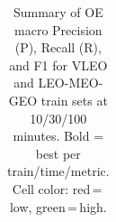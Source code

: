 \begin{table}[t]
{\begin{tabular}{l ccc ccc ccc ccc ccc ccc}
\bottomrule
\end{tabular}%
}
\caption{Summary of OE macro Precision (P), Recall (R), and F1 for VLEO and LEO-MEO-GEO train sets at 10/30/100 minutes. Bold = best per train/time/metric. Cell color: red\,=\,low, green\,=\,high.}
\label{tab:class_vleo_combined_oe}
\end{table}
